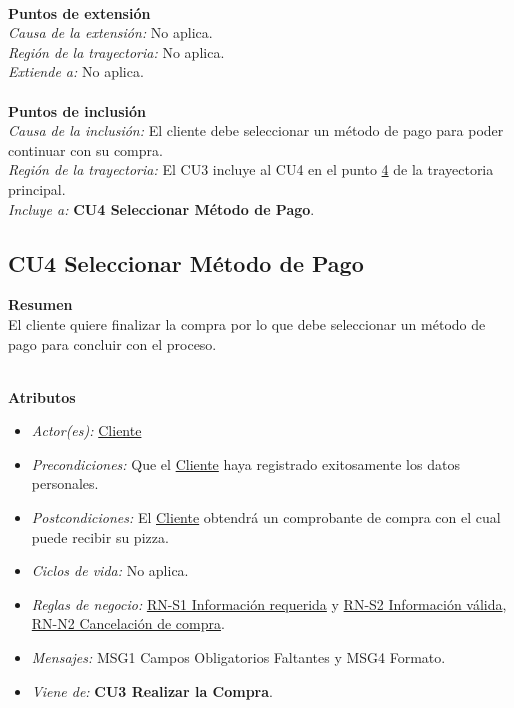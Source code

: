 \noindent \textbf{\\Puntos de extensión}\\

\noindent \textit{Causa de la extensión:} No aplica.\\
\textit{Región de la trayectoria:} No aplica.\\
\textit{Extiende a:} No aplica.\\


\noindent \textbf{\\Puntos de inclusión}\\

\noindent \textit{Causa de la inclusión:} El cliente debe seleccionar un método de pago para poder continuar con su compra.\\
\textit{Región de la trayectoria:} El CU3 incluye al CU4 en el punto \hyperlink{CU3:TP:P4}{4} de la trayectoria principal. \\
\textit{Incluye a:} \textbf{CU4 Seleccionar Método de Pago}.\\

\hypertarget{CU4}{}
\subsection{CU4 Seleccionar Método de Pago}

\noindent \textbf{Resumen}\\

El cliente quiere finalizar la compra por lo que debe seleccionar un método de pago para concluir con el proceso.

\noindent \textbf{\\Atributos}

\begin{itemize}
	
	\item \textit{Actor(es):} \hyperlink{A:Cliente}{Cliente}
	\item \textit{Precondiciones:} Que el \hyperlink{A:Cliente}{Cliente} haya registrado exitosamente los datos personales.
	\item \textit{Postcondiciones:} El \hyperlink{A:Cliente}{Cliente} obtendrá un comprobante de compra con el cual puede recibir su pizza.
	\item \textit{Ciclos de vida:} No aplica.
	\item \textit{Reglas de negocio:} \hyperlink{RN:S1:InfoRequerida}{RN-S1 Información requerida} y \hyperlink{RN:S2:InfoValida}{RN-S2 Información válida}, \hyperlink{RN:N2:Cancelacion}{RN-N2 Cancelación de compra}.
	\item \textit{Mensajes:} MSG1 Campos Obligatorios Faltantes y MSG4 Formato.
	\item \textit{Viene de:} \textbf{CU3 Realizar la Compra}.
	
\end{itemize} 

